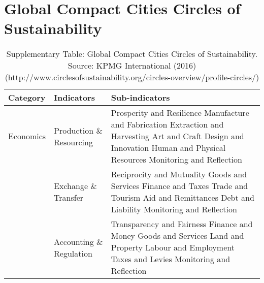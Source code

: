 
\chapter{Global Compact Cities Circles of Sustainability} %

\label{AppendixC} %

\begin{table}[th]
\caption{Supplementary Table: Global Compact Cities Circles of Sustainability. Source: KPMG International (2016) (http://www.circlesofsustainability.org/circles-overview/profile-circles/)}
\begin{center}
\begin{tabular}{ >{\raggedright\arraybackslash}p{} >{\raggedright\arraybackslash}p{} >{\raggedright\arraybackslash}p{} }
\hline
Category & Indicators & Sub-indicators \\
\hline
Economics & Production \& Resourcing & Prosperity and Resilience \linebreak Manufacture and Fabrication \linebreak Extraction and Harvesting \linebreak Art and Craft \linebreak Design and Innovation \linebreak Human and Physical Resources \linebreak Monitoring and Reflection \linebreak \\
  & Exchange \& Transfer & Reciprocity and Mutuality \linebreak Goods and Services \linebreak Finance and Taxes \linebreak Trade and Tourism \linebreak Aid and Remittances \linebreak Debt and Liability \linebreak Monitoring and Reflection  \linebreak \\
  & Accounting \& Regulation & Transparency and Fairness \linebreak Finance and Money \linebreak Goods and Services \linebreak Land and Property \linebreak Labour and Employment \linebreak Taxes and Levies \linebreak Monitoring and Reflection \linebreak \\

\end{tabular}
\end{center}
\end{table}
